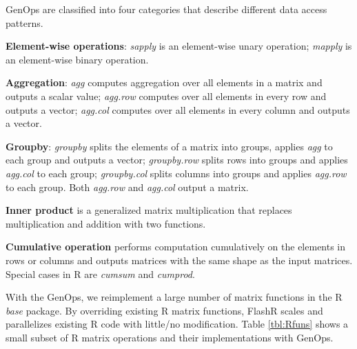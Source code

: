 GenOps are classified into four categories that describe different data access
patterns.

\noindent \textbf{Element-wise operations}:
\textit{sapply} is an element-wise unary operation; \textit{mapply}
is an element-wise binary operation.

\noindent \textbf{Aggregation}: \textit{agg} computes aggregation over
all elements in a matrix and outputs a scalar value; \textit{agg.row}
computes over all elements in every row and outputs a vector;
\textit{agg.col} computes over all elements in every column and
outputs a vector.

\noindent \textbf{Groupby}: \textit{groupby} splits the elements of a matrix
into groups, applies \textit{agg} to each group and outputs a vector;
\textit{groupby.row} splits rows into groups and applies \textit{agg.col}
to each group; \textit{groupby.col} splits columns into groups and applies
\textit{agg.row} to each group. Both \textit{agg.row} and \textit{agg.col}
output a matrix.

\noindent \textbf{Inner product} is a generalized matrix multiplication
that replaces multiplication and addition with two functions.

\noindent \textbf{Cumulative operation} performs computation cumulatively
on the elements in rows or columns and outputs matrices with the same
shape as the input matrices. Special cases in R are \textit{cumsum} and
\textit{cumprod}.

With the GenOps, we reimplement a large number of matrix functions in
the R \textit{base} package.
By overriding existing R matrix functions, FlashR scales and parallelizes
existing R code with little/no modification. Table \ref{tbl:Rfuns} shows
a small subset of R matrix operations and their implementations
with GenOps.

